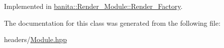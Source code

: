 Implemented in \mbox{\hyperlink{classbanita_1_1_render___module_1_1_render___factory_a13c65e4a433b3107602d91d9585bb381}{banita\+::\+Render\+\_\+\+Module\+::\+Render\+\_\+\+Factory}}.



The documentation for this class was generated from the following file\+:\begin{DoxyCompactItemize}
\item 
headers/\mbox{\hyperlink{_module_8hpp}{Module.\+hpp}}\end{DoxyCompactItemize}
